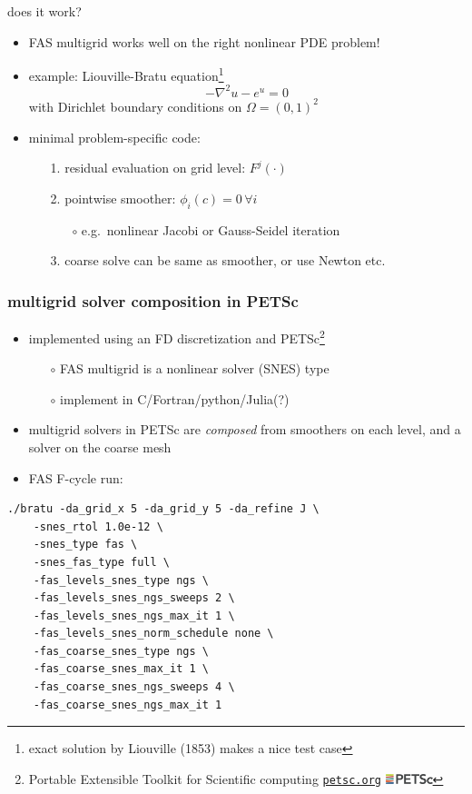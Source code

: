 \documentclass[svgnames,
               hyperref={colorlinks,citecolor=DeepPink4,linkcolor=FireBrick,urlcolor=Maroon},
               usepdftitle=false]  %
               {beamer}
\begin{document}
\begin{frame}{does it work?}

\begin{itemize}
\item FAS multigrid works well on the right nonlinear PDE problem!
\item example: Liouville-Bratu equation\footnote{exact solution by Liouville (1853) makes a nice test case}
    $$-\nabla^2 u - e^u = 0$$
with Dirichlet boundary conditions on $\Omega=(0,1)^2$
\item minimal problem-specific code:
    \begin{enumerate}
    \item[1.] residual evaluation on grid level: $F^j(\cdot)$
    \item[2.] pointwise smoother: $\phi_i(c) = 0 \,\forall i$
        \begin{itemize}
        \item[$\circ$] e.g.~nonlinear Jacobi or Gauss-Seidel iteration
        \end{itemize}
    \item[3.] coarse solve can be same as smoother, or use Newton etc.
    \end{enumerate}
\end{itemize}
\end{frame}


\begin{frame}[fragile]
\frametitle{multigrid solver composition in PETSc}

\begin{itemize}
\item implemented using an FD discretization and PETSc\footnote{Portable Extensible Toolkit for Scientific computing \quad \href{https://petsc.org/release/}{\texttt{petsc.org}} \quad \includegraphics[height=3mm]{images/petsc.png}}
    \begin{itemize}
    \item[$\circ$] FAS multigrid is a nonlinear solver (SNES) type
    \item[$\circ$] implement in C/Fortran/python/Julia(?)
    \end{itemize}
\item multigrid solvers in PETSc are \emph{composed} from smoothers on each level, and a solver on the coarse mesh
\item FAS F-cycle run:
\end{itemize}
\begin{Verbatim}[xleftmargin=15mm,fontsize=\scriptsize]
./bratu -da_grid_x 5 -da_grid_y 5 -da_refine J \
    -snes_rtol 1.0e-12 \
    -snes_type fas \
    -snes_fas_type full \
    -fas_levels_snes_type ngs \
    -fas_levels_snes_ngs_sweeps 2 \
    -fas_levels_snes_ngs_max_it 1 \
    -fas_levels_snes_norm_schedule none \
    -fas_coarse_snes_type ngs \
    -fas_coarse_snes_max_it 1 \
    -fas_coarse_snes_ngs_sweeps 4 \
    -fas_coarse_snes_ngs_max_it 1 
\end{Verbatim}

\end{frame}
\end{document}
